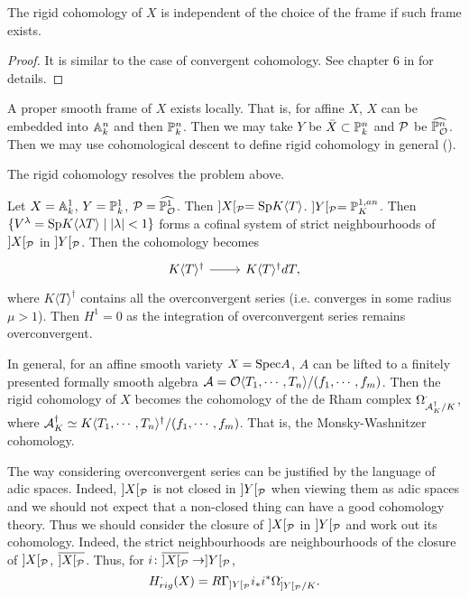 \begin{proposition}
    The rigid cohomology of $X$ is independent of the choice of the frame if such frame exists.
\end{proposition}

\begin{proof}
    It is similar to the case of convergent cohomology. 
    See chapter 6 in \cite{St} for details.
\end{proof}

\begin{remark}
    A proper smooth frame of $X$ exists locally. 
    That is, for affine $X$, $X$ can be embedded into ${\mathbb {A}}_k^n$ and then ${\mathbb {P}}_k^n$. 
    Then we may take $Y$ be $\bar{X} \subset {\mathbb {P}}_k^n$ and ${\mathcal {P}}$ be $\widehat{{\mathbb {P}}_{\mathcal {O}}^n}$. 
    Then we may use cohomological descent to define rigid cohomology in general (\cite{Tsu}).
\end{remark}

The rigid cohomology resolves the problem above.
\begin{example}
    Let $X = {\mathbb {A}}_k^1$, $Y = {\mathbb {P}}_k^1$, ${\mathcal {P}} = \widehat{{\mathbb {P}}_{{\mathcal {O}}}^1}$. 
    Then $]X[_{\mathcal {P}} = \mathrm{Sp} K \langle T \rangle$. $]Y[_{\mathcal {P}} = {\mathbb {P}}^{1,an}_K$. 
    Then $\{V^\lambda = \mathrm{Sp} K \langle \lambda T \rangle \mid |\lambda| < 1 \}$ 
    forms a cofinal system of strict neighbourhoods of $]X[_{\mathcal {P}}$ in $]Y[_{\mathcal {P}}$. 
    Then the cohomology becomes
    \[
        \begin{tikzcd}
            K \langle T \rangle^\dagger \ar[r] & K \langle T \rangle^\dagger dT,
        \end{tikzcd}
    \]
    where $K \langle T \rangle^ \dagger$ contains all the overconvergent series 
    (i.e. converges in some radius $\mu > 1$). 
    Then $H^1 = 0$ as the integration of overconvergent series remains overconvergent.

    In general, for an affine smooth variety $X = \mathrm{Spec} A$, 
    $A$ can be lifted to a finitely presented formally smooth algebra 
    ${\mathcal {A}} = {\mathcal {O}} \langle T_1, \cdots, T_n \rangle/(f_1, \cdots, f_m)$. 
    Then the rigid cohomology of $X$ becomes the cohomology of the de Rham complex 
    $\Omega_{{\mathcal {A}}_K^\dagger/K}^\cdot$, 
    where ${\mathcal {A}}_K^\dagger \simeq K \langle T_1, \cdots,T_n \rangle^\dagger/(f_1, \cdots, f_m)$. 
    That is, the Monsky-Washnitzer cohomology.
\end{example}

\begin{remark}
    The way considering overconvergent series can be justified by the language of adic spaces. 
    Indeed, $]X[_{\mathcal {P}}$ is not closed in $]Y[_{\mathcal {P}}$ when viewing them as adic spaces 
    and we should not expect that a non-closed thing can have a good cohomology theory. 
    Thus we should consider the closure of $]X[_{\mathcal {P}}$ in $]Y[_{\mathcal {P}}$ and work out its cohomology. 
    Indeed, the strict neighbourhoods are neighbourhoods of the closure of $]X[_{\mathcal {P}}$, $\overline{]X[_{\mathcal {P}}}$. 
    Thus, for $i \colon \overline{]X[_{\mathcal {P}}} \to ]Y[_{\mathcal {P}}$,
    \[
        H^\cdot_{rig}(X) = R\Gamma_{]Y[_{\mathcal {P}}} i_* i^* \Omega_{]Y[_{\mathcal {P}}/K}^\cdot.
    \]
\end{remark}

